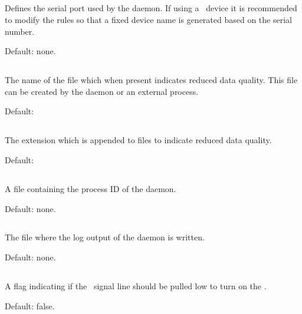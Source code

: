 \subsection{}
Defines the serial port used by the 
daemon. If using a \usb\ device it is recommended to modify the
 rules so that a fixed device name is generated based on
the serial number. 


Default: none.

\subsection{}
The name of the file which when present indicates reduced data
quality. This file can be created by the 
daemon or an external process.

Default: 

\subsection{}
The extension which is appended to files to indicate reduced data
quality.

Default: 

\subsection{}
A file containing the process ID of the 
daemon.

Default: none.

\subsection{}
The file where the log output of the 
daemon is written.

Default: none.

\subsection{}
A flag indicating if the \dtr\ signal line should be pulled low to
turn on the \led.

Default: false.

